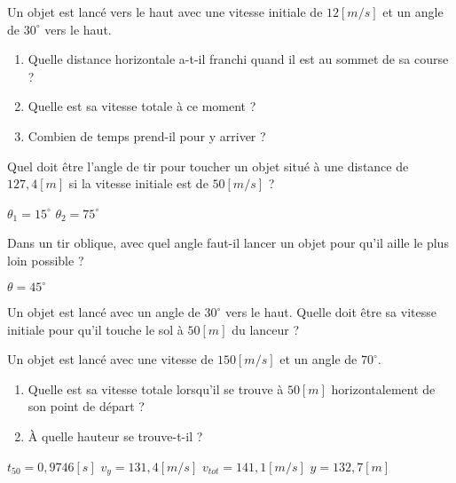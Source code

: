 \begin{exercise}
    Un objet est lancé vers le haut avec une vitesse initiale de \(12\unit{[m/s]}\) et un angle de \(30^{\circ}\) vers le haut.
    \begin{enumerate}
        \item Quelle distance horizontale a-t-il franchi quand il est au sommet de sa course ?
        \item Quelle est sa vitesse totale à ce moment ?
        \item Combien de temps prend-il pour y arriver ?
    \end{enumerate}
\end{exercise}


\begin{exercise}
    Quel doit être l'angle de tir pour toucher un objet situé à une distance de \(127,4[m]\) si la vitesse initiale est de \(50\unit{[m/s]}\) ?
\end{exercise}
\begin{solution}
    \(\theta_1=15^{\circ}\)
    \(\theta_2=75^{\circ}\)
\end{solution}


\begin{exercise}
    Dans un tir oblique, avec quel angle faut-il lancer un objet pour qu'il aille le plus loin possible ?
\end{exercise}
\begin{solution}
    \(\theta=45^{\circ}\)
\end{solution}


\begin{exercise}
    Un objet est lancé avec un angle de \(30^{\circ}\) vers le haut. Quelle doit être sa vitesse initiale pour qu'il touche le sol à \(50[m]\) du lanceur ?
\end{exercise}


\begin{exercise}
    Un objet est lancé avec une vitesse de \(150\unit{[m/s]}\) et un angle de \(70^{\circ}\).
    \begin{enumerate}[label=\alph*)]
        \item Quelle est sa vitesse totale lorsqu'il se trouve à \(50[m]\) horizontalement de son point de départ ?
        \item À quelle hauteur se trouve-t-il ?
    \end{enumerate}
\end{exercise}
\begin{solution}
    \(t_{50}=0,9746[s]\)
    \(v_y=131,4\unit{[m/s]}\)
    \(v_{tot}=141,1\unit{[m/s]}\)
    \(y=132,7[m]\)
\end{solution}


